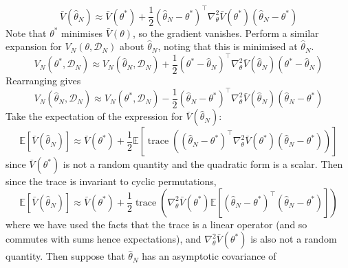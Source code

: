 \documentclass[11pt]{report} %
\begin{document}
\begin{equation}
\bar{V}\left(\hat{\theta}_{N}\right) \approx \bar{V}\left(\theta^{*}\right) + \dfrac{1}{2}\left(\hat{\theta}_{N} - \theta^{*}\right)^{\top}\nabla_{\theta}^{2}\bar{V}\left(\theta^{*}\right)\left(\hat{\theta}_{N} - \theta^{*}\right)
\end{equation}
Note that $\theta^{*}$ minimises $\bar{V}\left(\theta\right)$, so the gradient vanishes. Perform a similar expansion for $V_{N}\left(\theta, \mathcal{D}_{N}\right)$ about $\hat{\theta}_{N}$, noting that this is minimised at $\hat{\theta}_{N}$.
\begin{equation}
V_{N}\left(\theta^{*}, \mathcal{D}_{N}\right) \approx V_{N}\left(\hat{\theta}_{N}, \mathcal{D}_{N}\right) + \dfrac{1}{2}\left(\theta^{*} - \hat{\theta}_{N}\right)^{\top}\nabla_{\theta}^{2}\bar{V}\left(\hat{\theta}_{N}\right)\left(\theta^{*} - \hat{\theta}_{N}\right)
\end{equation}
Rearranging gives
\begin{equation}
V_{N}\left(\hat{\theta}_{N}, \mathcal{D}_{N}\right) \approx V_{N}\left(\theta^{*}, \mathcal{D}_{N}\right) - \dfrac{1}{2}\left(\hat{\theta}_{N} - \theta^{*}\right)^{\top}\nabla_{\theta}^{2}\bar{V}\left(\hat{\theta}_{N}\right)\left(\hat{\theta}_{N} - \theta^{*}\right)
\end{equation}
Take the expectation of the expression for $\bar{V}\left(\hat{\theta}_{N}\right)$:
\begin{equation}
\mathbb{E}\left[\bar{V}\left(\hat{\theta}_{N}\right)\right] \approx \bar{V}\left(\theta^{*}\right) + \dfrac{1}{2}\mathbb{E}\left[\operatorname{trace}\left(\left(\hat{\theta}_{N} - \theta^{*}\right)^{\top}\nabla_{\theta}^{2}\bar{V}\left(\theta^{*}\right)\left(\hat{\theta}_{N} - \theta^{*}\right)\right)\right]
\end{equation}
since $\bar{V}\left(\theta^{*}\right)$ is not a random quantity and the quadratic form is a scalar. Then since the trace is invariant to cyclic permutations,
\begin{equation}
\mathbb{E}\left[\bar{V}\left(\hat{\theta}_{N}\right)\right] \approx \bar{V}\left(\theta^{*}\right) + \dfrac{1}{2}\operatorname{trace}\left(\nabla_{\theta}^{2}\bar{V}\left(\theta^{*}\right)\mathbb{E}\left[\left(\hat{\theta}_{N} - \theta^{*}\right)^{\top}\left(\hat{\theta}_{N} - \theta^{*}\right)\right]\right)
\end{equation}
where we have used the facts that the trace is a linear operator (and so commutes with sums hence expectations), and $\nabla_{\theta}^{2}\bar{V}\left(\theta^{*}\right)$ is also not a random quantity. Then suppose that $\hat{\theta}_{N}$ has an asymptotic covariance of
\end{document}
